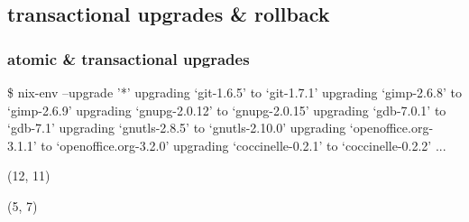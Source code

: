 \documentclass{beamer}
\begin{document}
\subsection{transactional upgrades \& rollback}

\begin{frame}[fragile]
  \frametitle{atomic \& transactional upgrades}

  \begin{semiverbatim}
\$ \alert<1>{nix-env --upgrade '*'}
upgrading `git-\alert<4->{1.6.5}' to `git-\alert<2>{1.7.1}'
upgrading `gimp-\alert<4->{2.6.8}' to `gimp-\alert<2>{2.6.9}'
upgrading `gnupg-2.0.12' to `gnupg-2.0.15'
upgrading `gdb-7.0.1' to `gdb-7.1'
upgrading `gnutls-2.8.5' to `gnutls-2.10.0'
upgrading `openoffice.org-3.1.1' to `openoffice.org-3.2.0'
upgrading `coccinelle-0.2.1' to `coccinelle-0.2.2'
...

  \end{semiverbatim}

  \begin{textblock}{9}(12, 11)
  \end{textblock}

  \begin{textblock}{9}(5, 7)
  \end{textblock}

\end{frame}
\end{document}
